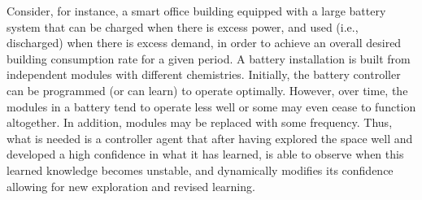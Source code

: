 Consider, for instance, a smart office building equipped with a large battery system that can be charged when there is excess power, and used (i.e., discharged) when there is excess demand, in order to achieve an overall desired building consumption rate for a given period. A battery installation is built from independent modules with different chemistries. Initially, the battery controller can be programmed (or can learn) to operate optimally. However, over time, the modules in a battery tend to operate less well or some may even cease to function altogether. In addition, modules may be replaced with some frequency.  
Thus, what is needed is a controller agent that after having explored the space well and developed a high confidence in what it has learned, is able to observe when this learned knowledge becomes unstable, and dynamically modifies its confidence allowing for new exploration and revised learning.

\newpage

%
%
